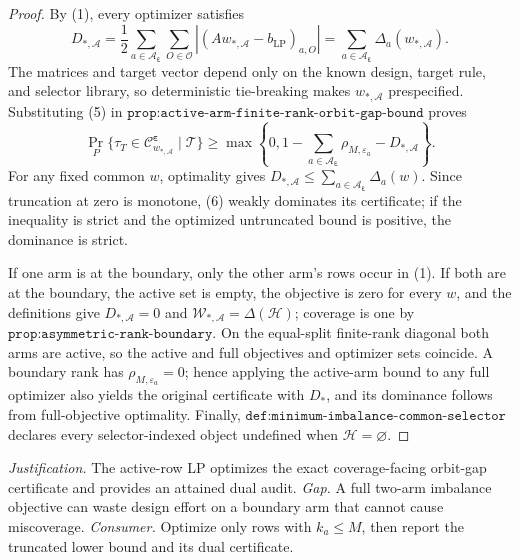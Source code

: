 \documentclass{article}
\begin{document}
\begin{proof}
By (1), every optimizer satisfies
\[
D_{*,\mathcal A}=\frac12\sum_{a\in\mathcal A_{\boldsymbol\varepsilon}}\sum_{O\in\mathcal O}|(Aw_{*,\mathcal A}-b_{\mathrm{LP}})_{a,O}|=\sum_{a\in\mathcal A_{\boldsymbol\varepsilon}}\Delta_a(w_{*,\mathcal A}).
\tag{5}
\]
The matrices and target vector depend only on the known design, target rule, and selector library, so deterministic tie-breaking makes \(w_{*,\mathcal A}\) prespecified. Substituting (5) in \(\texttt{prop:active-arm-finite-rank-orbit-gap-bound}\) proves
\[
\Pr_P\{\tau_T\in\mathcal C^{\boldsymbol\varepsilon}_{w_{*,\mathcal A}}\mid\mathcal T\}\ge\max\left\{0,1-\sum_{a\in\mathcal A_{\boldsymbol\varepsilon}}\rho_{M,\varepsilon_a}-D_{*,\mathcal A}\right\}.
\tag{6}
\]
For any fixed common \(w\), optimality gives \(D_{*,\mathcal A}\le\sum_{a\in\mathcal A_{\boldsymbol\varepsilon}}\Delta_a(w)\). Since truncation at zero is monotone, (6) weakly dominates its certificate; if the inequality is strict and the optimized untruncated bound is positive, the dominance is strict.

If one arm is at the boundary, only the other arm's rows occur in (1). If both are at the boundary, the active set is empty, the objective is zero for every \(w\), and the definitions give \(D_{*,\mathcal A}=0\) and \(\mathcal W_{*,\mathcal A}=\Delta(\mathcal H)\); coverage is one by \(\texttt{prop:asymmetric-rank-boundary}\). On the equal-split finite-rank diagonal both arms are active, so the active and full objectives and optimizer sets coincide. A boundary rank has \(\rho_{M,\varepsilon_a}=0\); hence applying the active-arm bound to any full optimizer also yields the original certificate with \(D_*\), and its dominance follows from full-objective optimality. Finally, \(\texttt{def:minimum-imbalance-common-selector}\) declares every selector-indexed object undefined when \(\mathcal H=\varnothing\).
\end{proof}
\par\smallskip\noindent \textit{Justification.} The active-row LP optimizes the exact coverage-facing orbit-gap certificate and provides an attained dual audit. \textit{Gap.} A full two-arm imbalance objective can waste design effort on a boundary arm that cannot cause miscoverage. \textit{Consumer.} Optimize only rows with \(k_a\le M\), then report the truncated lower bound and its dual certificate.
\end{document}
